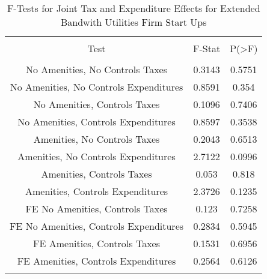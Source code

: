
\begin{table}[!htbp] \centering 
  \caption{F-Tests for Joint Tax and Expenditure Effects for Extended Bandwith Utilities Firm Start Ups} 
  \label{22Ftests} 
\begin{tabular}{@{\extracolsep{5pt}} ccc} 
\\[-1.8ex]\hline 
\hline \\[-1.8ex] 
Test & F-Stat & P(\textgreater F) \\ 
\hline \\[-1.8ex] 
No Amenities, No Controls Taxes & 0.3143 & 0.5751 \\ 
No Amenities, No Controls Expenditures & 0.8591 & 0.354 \\ 
No Amenities, Controls Taxes & 0.1096 & 0.7406 \\ 
No Amenities, Controls Expenditures & 0.8597 & 0.3538 \\ 
Amenities, No Controls Taxes & 0.2043 & 0.6513 \\ 
Amenities, No Controls Expenditures & 2.7122 & 0.0996 \\ 
Amenities, Controls Taxes & 0.053 & 0.818 \\ 
Amenities, Controls Expenditures & 2.3726 & 0.1235 \\ 
FE No Amenities, Controls Taxes & 0.123 & 0.7258 \\ 
FE No Amenities, Controls Expenditures & 0.2834 & 0.5945 \\ 
FE Amenities, Controls Taxes & 0.1531 & 0.6956 \\ 
FE Amenities, Controls Expenditures & 0.2564 & 0.6126 \\ 
\hline \\[-1.8ex] 
\end{tabular} 
\end{table} 
